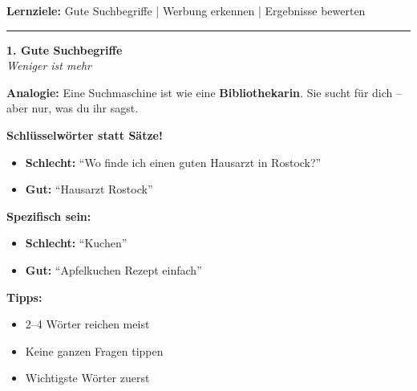 \documentclass[a4paper,landscape,8pt]{extarticle}
\begin{document}

 \hfill
{\footnotesize\textbf{Lernziele:} Gute Suchbegriffe | Werbung erkennen | Ergebnisse bewerten}

\vspace{1mm}
\hrule
\vspace{1mm}

\begin{minipage}[t]{0.32\linewidth}
\begin{center}
\colorbox{searchblue!10}{%
\begin{minipage}{0.95\linewidth}
\vspace{2mm}
\begin{center}
{\Large\bfseries\textcolor{searchblue}{1. Gute Suchbegriffe}}\\[1pt]
{\footnotesize\itshape Weniger ist mehr}
\end{center}
\vspace{2mm}
\end{minipage}%
}
\end{center}

\vspace{1mm}

\textbf{Analogie:} Eine Suchmaschine ist wie eine \textbf{Bibliothekarin}. Sie sucht für dich -- aber nur, was du ihr sagst.

\textbf{Schlüsselwörter statt Sätze!}
\begin{itemize}
\item \textcolor{warnred}{\textbf{Schlecht:}} ``Wo finde ich einen guten Hausarzt in Rostock?''
\item \textcolor{successgreen}{\textbf{Gut:}} ``Hausarzt Rostock''
\end{itemize}

\textbf{Spezifisch sein:}
\begin{itemize}
\item \textcolor{warnred}{\textbf{Schlecht:}} ``Kuchen''
\item \textcolor{successgreen}{\textbf{Gut:}} ``Apfelkuchen Rezept einfach''
\end{itemize}

\textbf{Tipps:}
\begin{itemize}
\item 2--4 Wörter reichen meist
\item Keine ganzen Fragen tippen
\item Wichtigste Wörter zuerst
\end{itemize}

\end{minipage}%
\end{document}

